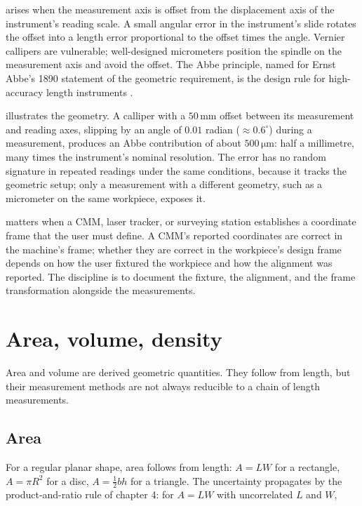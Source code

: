  arises when the measurement axis is offset from
the displacement axis of the instrument's reading scale. A small
angular error in the instrument's slide rotates the offset into a
length error proportional to the offset times the angle. Vernier
callipers are vulnerable; well-designed micrometers position the
spindle on the measurement axis and avoid the offset. The
Abbe principle, named for Ernst Abbe's 1890 statement of the
geometric requirement, is the design rule for high-accuracy
length instruments \cite{paper:bryan-abbe-1979}.



 illustrates the geometry. A
calliper with a $50 \,\si{\milli\meter}$ offset between its
measurement and reading axes, slipping by an angle of $0.01$ radian
($\approx 0.6^{\circ}$) during a measurement, produces an Abbe
contribution of about $500 \,\si{\micro\meter}$: half a millimetre,
many times the instrument's nominal resolution. The error has no
random signature in repeated readings under the same conditions,
because it tracks the geometric setup; only a measurement with a
different geometry, such as a micrometer on the same workpiece,
exposes it.

 matters when a CMM, laser
tracker, or surveying station establishes a coordinate frame that
the user must define. A CMM's reported coordinates are correct in
the machine's frame; whether they are correct in the workpiece's
design frame depends on how the user fixtured the workpiece and how
the alignment was reported. The discipline is to document the
fixture, the alignment, and the frame transformation alongside the
measurements.

\section{Area, volume, density}

Area and volume are derived geometric quantities. They follow from
length, but their measurement methods are not always reducible to a
chain of length measurements.

\subsection{Area}

For a regular planar shape, area follows from length:
$A = L W$ for a rectangle, $A = \pi R^{2}$ for a disc,
$A = \tfrac{1}{2} b h$ for a triangle. The uncertainty propagates by
the product-and-ratio rule of chapter 4: for $A = L W$ with
uncorrelated $L$ and $W$,

